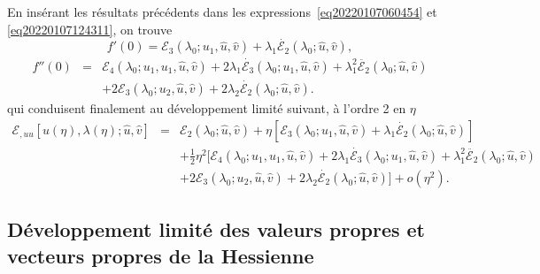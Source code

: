 \documentclass[12pt, final]{amsart}
\begin{document}
En insérant les résultats précédents dans les
expressions~\eqref{eq20220107060454} et \eqref{eq20220107124311}, on trouve
\begin{equation}
  f' (0) =\mathcal{E}_3 (\lambda_0 ; u_1, \hat{u}, \hat{v}) + \lambda_1
  \dot{\mathcal{E}_2} (\lambda_0 ; \hat{u}, \hat{v}),
\end{equation}
\begin{eqnarray}
  f'' (0) & = & \mathcal{E}_4 (\lambda_0 ; u_1, u_1, \hat{u}, \hat{v}) + 2
  \lambda_1  \dot{\mathcal{E}_3} (\lambda_0 ; u_1, \hat{u}, \hat{v}) +
  \lambda_1^2  \ddot{\mathcal{E}_2} (\lambda_0 ; \hat{u}, \hat{v}) \nonumber\\
  &  &  + 2\mathcal{E}_3 (\lambda_0 ; u_2, \hat{u}, \hat{v}) + 2
  \lambda_2  \dot{\mathcal{E}_2} (\lambda_0 ; \hat{u}, \hat{v}) .
\end{eqnarray}
qui conduisent finalement au développement limité suivant, {\`a}
l'ordre 2 en $\eta$
\begin{eqnarray}
  \mathcal{E}_{, u  u} [u (\eta), \lambda (\eta) ; \hat{u}, \hat{v}] &
  = & \mathcal{E}_2 (\lambda_0 ; \hat{u}, \hat{v}) + \eta [\mathcal{E}_3
  (\lambda_0 ; u_1, \hat{u}, \hat{v})   + \lambda_1
  \dot{\mathcal{E}_2} (\lambda_0 ; \hat{u}, \hat{v})] \nonumber\\
  &  &  + \tfrac{1}{2} \eta^2  [\mathcal{E}_4 (\lambda_0 ; u_1, u_1,
  \hat{u}, \hat{v})  + 2 \lambda_1  \dot{\mathcal{E}_3} (\lambda_0 ;
  u_1, \hat{u}, \hat{v}) + \lambda_1^2  \ddot{\mathcal{E}_2} (\lambda_0 ;
  \hat{u}, \hat{v}) \nonumber\\
  &  &   + 2\mathcal{E}_3 (\lambda_0 ; u_2, \hat{u},
  \hat{v}) + 2 \lambda_2  \dot{\mathcal{E}_2} (\lambda_0 ; \hat{u}, \hat{v})]
  + o (\eta^2) .
\end{eqnarray}

\subsection{Développement limité des valeurs propres et vecteurs
propres de la Hessienne}
\end{document}
